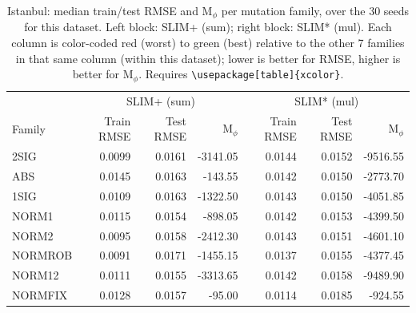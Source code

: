 \begin{table}[t]
\centering
\caption{Istanbul: median train/test RMSE and M$_\phi$ per mutation family, over the 30 seeds for this dataset. Left block: SLIM+ (sum); right block: SLIM* (mul). Each column is color-coded red (worst) to green (best) relative to the other 7 families in that same column (within this dataset); lower is better for RMSE, higher is better for M$_\phi$. Requires \texttt{\textbackslash usepackage[table]\{xcolor\}}.}
\label{tab:summary-median-performance-instanbul}
\begin{tabular}{lrrr|rrr}
\toprule
& \multicolumn{3}{c|}{SLIM+ (sum)} & \multicolumn{3}{c}{SLIM* (mul)} \\
Family & Train RMSE & Test RMSE & M$_\phi$ & Train RMSE & Test RMSE & M$_\phi$ \\
\midrule
2SIG & \cellcolor[HTML]{C6E3AE}0.0099 & \cellcolor[HTML]{F5F3A8}0.0161 & \cellcolor[HTML]{FBB3A5}-3141.05 & \cellcolor[HTML]{FAAAA5}0.0144 & \cellcolor[HTML]{B7DEAF}0.0152 & \cellcolor[HTML]{FAAAA5}-9516.55 \\
ABS & \cellcolor[HTML]{FAAAA5}0.0145 & \cellcolor[HTML]{FFF3A7}0.0163 & \cellcolor[HTML]{B1DCB0}-143.55 & \cellcolor[HTML]{FBB9A5}0.0142 & \cellcolor[HTML]{B0DBB0}0.0150 & \cellcolor[HTML]{D1E7AC}-2773.70 \\
1SIG & \cellcolor[HTML]{E4EDAA}0.0109 & \cellcolor[HTML]{FEEDA7}0.0163 & \cellcolor[HTML]{ECF0A9}-1322.50 & \cellcolor[HTML]{FAAFA5}0.0143 & \cellcolor[HTML]{AEDBB0}0.0150 & \cellcolor[HTML]{E9EFA9}-4051.85 \\
NORM1 & \cellcolor[HTML]{F6F3A8}0.0115 & \cellcolor[HTML]{AEDBB0}0.0154 & \cellcolor[HTML]{D7E8AC}-898.05 & \cellcolor[HTML]{FBB6A5}0.0142 & \cellcolor[HTML]{BDE0AF}0.0153 & \cellcolor[HTML]{F0F1A9}-4399.50 \\
NORM2 & \cellcolor[HTML]{BADFAF}0.0095 & \cellcolor[HTML]{D5E8AC}0.0158 & \cellcolor[HTML]{FDD5A6}-2412.30 & \cellcolor[HTML]{FBB2A5}0.0143 & \cellcolor[HTML]{B3DDB0}0.0151 & \cellcolor[HTML]{F3F2A8}-4601.10 \\
NORMROB & \cellcolor[HTML]{AEDBB0}0.0091 & \cellcolor[HTML]{FAAAA5}0.0171 & \cellcolor[HTML]{F3F2A8}-1455.15 & \cellcolor[HTML]{FDD1A6}0.0137 & \cellcolor[HTML]{C7E3AD}0.0155 & \cellcolor[HTML]{EFF1A9}-4377.45 \\
NORM12 & \cellcolor[HTML]{EAEFA9}0.0111 & \cellcolor[HTML]{BDE0AE}0.0155 & \cellcolor[HTML]{FAAAA5}-3313.65 & \cellcolor[HTML]{FBB4A5}0.0142 & \cellcolor[HTML]{D2E7AC}0.0158 & \cellcolor[HTML]{FAABA5}-9489.90 \\
NORMFIX & \cellcolor[HTML]{FDD9A6}0.0128 & \cellcolor[HTML]{CDE5AD}0.0157 & \cellcolor[HTML]{AEDBB0}-95.00 & \cellcolor[HTML]{AEDBB0}0.0114 & \cellcolor[HTML]{FAAAA5}0.0185 & \cellcolor[HTML]{AEDBB0}-924.55 \\
\bottomrule
\end{tabular}
\end{table}

